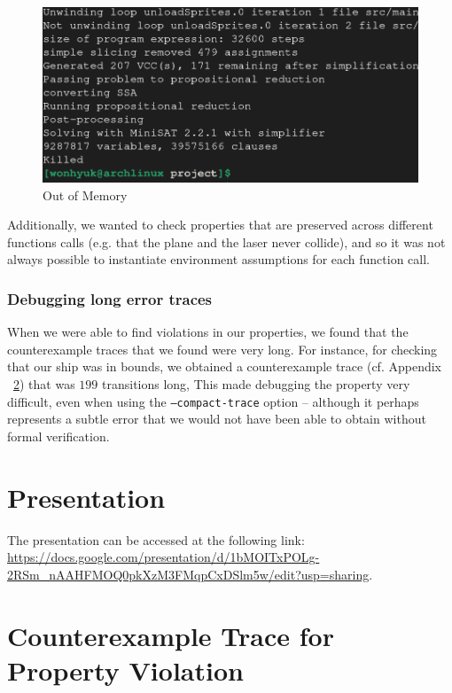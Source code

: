 \documentclass{article}
\begin{document}
            \begin{figure}[h!]
                \includegraphics[width=\linewidth]{killed.png}
                \caption{Out of Memory}
                \label{fig:killed}
            \end{figure}

            Additionally, we wanted to check properties that are preserved
            across different functions calls (e.g. that the plane and the laser
            never collide), and so it was not always possible to instantiate
            environment assumptions for each function call.

        \subsubsection{Debugging long error traces}

            When we were able to find violations in our properties, we found
            that the counterexample traces that we found were very long. For
            instance, for checking that our ship was in bounds, we obtained a
            counterexample trace (cf. Appendix ~\ref{appendix:trace}) that was
            $199$ transitions long, This made debugging the property very
            difficult, even when using the \texttt{--compact-trace} option --
            although it perhaps represents a subtle error that we would not have
            been able to obtain without formal verification.

\section{Presentation}

    The presentation can be accessed at the following link:
    \url{https://docs.google.com/presentation/d/1bMOITxPOLg-2RSm_nAAHFMOQ0pkXzM3FMqpCxDSlm5w/edit?usp=sharing}.




\appendix
\section{Counterexample Trace for Property Violation}
\label{appendix:trace}

\end{document}
